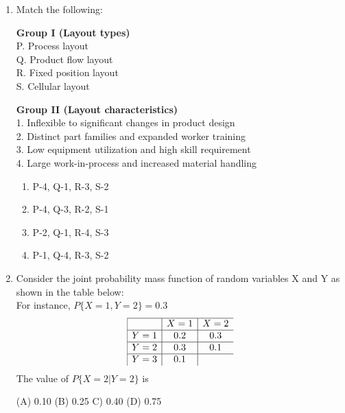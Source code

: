 \documentclass[a4paper,12pt]{article}
\begin{document}
\begin{enumerate}[label=Q.\arabic*, leftmargin=*]
\item Match the following: \\
\noindent
\begin{minipage}[t]{0.45\textwidth}
\textbf{Group I (Layout types)}\\[0.5em]
P. Process layout \\
Q. Product flow layout \\
R. Fixed position layout \\
S. Cellular layout
\end{minipage}
\hfill
\begin{minipage}[t]{0.9\textwidth}
\textbf{Group II (Layout characteristics)}\\[0.5em]
1. Inflexible to significant changes in product design \\
2. Distinct part families and expanded worker training \\
3. Low equipment utilization and high skill requirement \\
4. Large work-in-process and increased material handling
\end{minipage}


\begin{multicols}{2}
\begin{enumerate}[label=(\Alph*)]
    \item P-4, Q-1, R-3, S-2
    \item P-4, Q-3, R-2, S-1
    \item P-2, Q-1, R-4, S-3
    \item P-1, Q-4, R-3, S-2
\end{enumerate}
\end{multicols}

\item Consider the joint probability mass function of random variables X and Y as shown in the table below: \\
For instance, $P\{X=1, Y=2\} = 0.3$
$$
\begin{array}{|c|c|c}
\hline
& X=1 & X=2 \\ \hline
Y=1 & 0.2 & 0.3 \\ \hline
Y=2 & 0.3 & 0.1 \\  \hline
Y=3 & 0.1 & \\
\end{array}
$$
The value of $P\{X=2|Y=2\}$ is

(A) 0.10 \hfill (B) 0.25 \hfill C) 0.40 \hfill (D) 0.75 


\end{enumerate}
\end{document}
